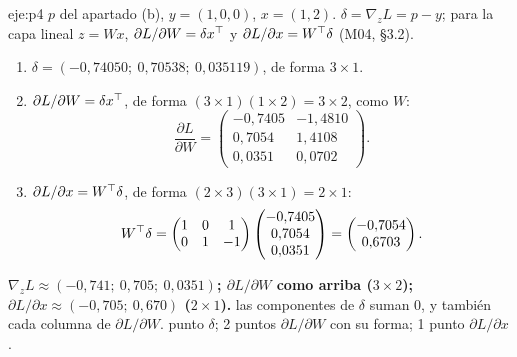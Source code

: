 \begin{solucion}{eje:p4}
\datos $p$ del apartado (b), $y=(1,0,0)$, $x=(1,2)$.
\planteamiento $\delta=\nabla_zL=p-y$; para la capa lineal $z=Wx$, $\partial L/\partial W=\delta x^{\top}$ y $\partial L/\partial x=W^{\top}\delta$ (M04, §3.2).
\pasos
\begin{enumerate}[label=\arabic*.]
  \item $\delta=(-0{,}74050;\ 0{,}70538;\ 0{,}035119)$, de forma $3\times1$.
  \item $\partial L/\partial W=\delta x^{\top}$, de forma $(3\times1)(1\times2)=3\times2$, como $W$:
  \[
  \frac{\partial L}{\partial W}=\begin{pmatrix}-0{,}7405&-1{,}4810\\0{,}7054&1{,}4108\\0{,}0351&0{,}0702\end{pmatrix}.
  \]
  \item $\partial L/\partial x=W^{\top}\delta$, de forma $(2\times3)(3\times1)=2\times1$:
  \[
  W^{\top}\delta=\begin{pmatrix}1&0&1\\0&1&-1\end{pmatrix}\begin{pmatrix}-0{,}7405\\0{,}7054\\0{,}0351\end{pmatrix}=\begin{pmatrix}-0{,}7054\\0{,}6703\end{pmatrix}.
  \]
\end{enumerate}
\resultado \textbf{$\nabla_zL\approx(-0{,}741;\ 0{,}705;\ 0{,}0351)$; $\partial L/\partial W$ como arriba ($3\times2$); $\partial L/\partial x\approx(-0{,}705;\ 0{,}670)$ ($2\times1$).}
\comprobacion las componentes de $\delta$ suman $0$, y también cada columna de $\partial L/\partial W$.
 punto $\delta$; 2 puntos $\partial L/\partial W$ con su forma; 1 punto $\partial L/\partial x$.


\end{solucion}
